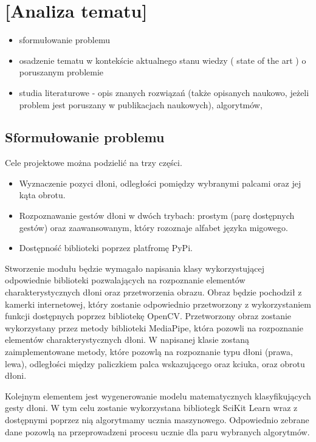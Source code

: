 \chapter{[Analiza tematu]}

\begin{itemize}
\item sformułowanie problemu
\item osadzenie tematu w kontekście aktualnego stanu wiedzy ( state of the art ) o poruszanym problemie
\item  studia literaturowe \cite{bib:artykul,bib:ksiazka,bib:konferencja,bib:url} -  opis znanych rozwiązań (także opisanych naukowo, jeżeli problem jest poruszany w publikacjach naukowych), algorytmów, 
\end{itemize}

\section {Sformułowanie problemu}
\quad Cele projektowe można podzielić na trzy części. 

\begin{itemize}
    \item Wyznaczenie pozyci dłoni, odległości pomiędzy wybranymi palcami oraz jej kąta obrotu. 
    \item Rozpoznawanie gestów dłoni w dwóch trybach: prostym (parę dostępnych gestów) oraz zaawansowanym, który rozoznaje alfabet języka migowego. 
    \item Dostępność biblioteki poprzez platfromę PyPi. 
\end{itemize}

\quad Stworzenie modułu będzie wymagało napisania klasy wykorzystującej odpowiednie biblioteki pozwalających na rozpoznanie elementów charakterystycznych dłoni oraz przetworzenia obrazu. Obraz będzie pochodził z kamerki internetowej, który zostanie odpowiednio przetworzony z wykorzystaniem funkcji dostępnych poprzez bibliotekę OpenCV. Przetworzony obraz zostanie wykorzystany przez metody biblioteki MediaPipe, która pozowli na rozpoznanie elementów charakterystycznych dłoni. W napisanej klasie zostaną zaimplementowane metody, które pozowlą na rozpoznanie typu dłoni (prawa, lewa), odległości między paliczkiem palca wskazującego oraz kciuka, oraz obrotu dłoni. 

\quad Kolejnym elementem jest wygenerowanie modelu matematycznych klasyfikujących gesty dłoni. W tym celu zostanie wykorzystana bibliotegk SciKit Learn wraz z dostępnymi poprzez nią algorytmamy ucznia maszynowego. Odpowiednio zebrane dane pozowlą na przeprowadzeni procesu ucznie dla paru wybranych algorytmów. 

